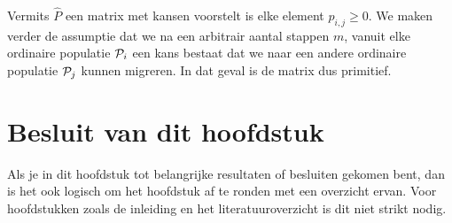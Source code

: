 \paragraph{}
Vermits $\hat{P}$ een matrix met kansen voorstelt is elke element $\hat{p}_{i,j}\geq 0$. We maken verder de assumptie dat we na een arbitrair aantal stappen $m$, vanuit elke ordinaire populatie $\mathcal{P}_i$ een kans bestaat dat we naar een andere ordinaire populatie $\mathcal{P}_j$ kunnen migreren. In dat geval is de matrix dus primitief.
\section{Besluit van dit hoofdstuk}
Als je in dit hoofdstuk tot belangrijke resultaten of besluiten gekomen
bent, dan is het ook logisch om het hoofdstuk af te ronden met een
overzicht ervan. Voor hoofdstukken zoals de inleiding en het
literatuuroverzicht is dit niet strikt nodig.

